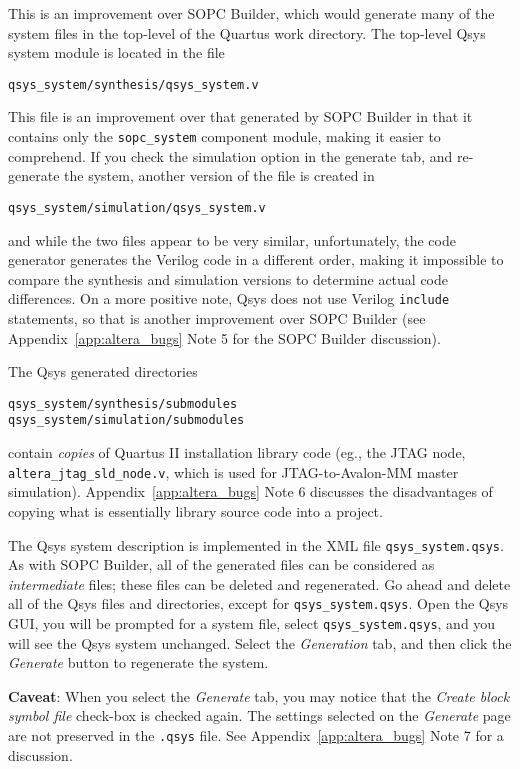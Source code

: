 \documentclass[10pt,twoside]{article}
\begin{document}
This is an improvement over SOPC Builder, which would generate many of
the system files in the top-level of the Quartus work directory.
The top-level Qsys system module is located in the file
%
\begin{verbatim}
qsys_system/synthesis/qsys_system.v
\end{verbatim}
%
This file is an improvement over that generated by SOPC Builder in that it
contains only the \verb+sopc_system+ component module, making it easier to
comprehend. If you check the simulation option in the generate tab, 
and re-generate the system, another version of the file is created in
%
\begin{verbatim}
qsys_system/simulation/qsys_system.v
\end{verbatim}
%
and while the two files appear to be very similar, unfortunately, the code
generator generates the Verilog code in a different order, making it impossible
to compare the synthesis and simulation versions to determine actual code
differences. 
On a more positive note, Qsys does not use Verilog \verb+include+ 
statements, so that is another improvement over SOPC Builder
(see Appendix~\ref{app:altera_bugs} Note 5\label{bug:5}
for the SOPC Builder discussion).

The Qsys generated directories
%
\begin{verbatim}
qsys_system/synthesis/submodules
qsys_system/simulation/submodules
\end{verbatim}
%
contain {\em copies} of Quartus II installation library code 
(eg., the JTAG node, \verb+altera_jtag_sld_node.v+, which is used for 
JTAG-to-Avalon-MM master simulation). Appendix~\ref{app:altera_bugs} 
Note 6\label{bug:6b} discusses the disadvantages of 
copying what is essentially library source code into a project.

The Qsys system description is implemented in the XML file \verb+qsys_system.qsys+.
As with SOPC Builder, all of the generated files can be considered as
{\em intermediate} files; these files can be deleted and regenerated.
Go ahead and delete all of the Qsys files and directories, 
except for \verb+qsys_system.qsys+. Open the Qsys GUI, you will
be prompted for a system file, select \verb+qsys_system.qsys+,
and you will see the Qsys system unchanged. Select the {\em Generation}
tab, and then click the {\em Generate} button to regenerate the system.

\vskip5mm
{\bf Caveat}:\label{bug:7} 
When you select the {\em Generate} tab, you may notice that
the {\em Create block symbol file} check-box is checked again. The
settings selected on the {\em Generate} page are not preserved
in the \verb+.qsys+ file. See Appendix~\ref{app:altera_bugs}
Note 7 for a discussion.
\end{document}

